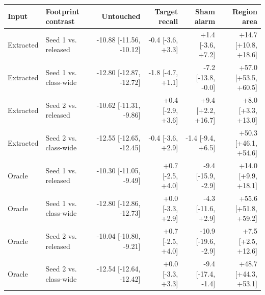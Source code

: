 \begin{tabular}{llrrrr}
\toprule
Input & Footprint contrast & Untouched & Target recall & Sham alarm & Region area \\
\midrule
Extracted & Seed 1 vs. released & -10.88 [-11.56, -10.12] & -0.4 [-3.6, +3.3] & +1.4 [-3.6, +7.2] & +14.7 [+10.8, +18.6] \\
Extracted & Seed 1 vs. class-wide & -12.80 [-12.87, -12.72] & -1.8 [-4.7, +1.1] & -7.2 [-13.8, -0.0] & +57.0 [+53.5, +60.5] \\
Extracted & Seed 2 vs. released & -10.62 [-11.31, -9.86] & +0.4 [-2.9, +3.6] & +9.4 [+2.2, +16.7] & +8.0 [+3.3, +13.0] \\
Extracted & Seed 2 vs. class-wide & -12.55 [-12.65, -12.45] & -0.4 [-3.6, +2.9] & -1.4 [-9.4, +6.5] & +50.3 [+46.1, +54.6] \\
\midrule
Oracle & Seed 1 vs. released & -10.30 [-11.05, -9.49] & +0.7 [-2.5, +4.0] & -9.4 [-15.9, -2.9] & +14.0 [+9.9, +18.1] \\
Oracle & Seed 1 vs. class-wide & -12.80 [-12.86, -12.73] & +0.0 [-3.3, +2.9] & -4.3 [-11.6, +2.9] & +55.6 [+51.8, +59.2] \\
Oracle & Seed 2 vs. released & -10.04 [-10.80, -9.21] & +0.7 [-2.5, +4.0] & -10.9 [-19.6, -2.9] & +7.5 [+2.5, +12.6] \\
Oracle & Seed 2 vs. class-wide & -12.54 [-12.64, -12.42] & +0.0 [-3.3, +3.3] & -9.4 [-17.4, -1.4] & +48.7 [+44.3, +53.1] \\
\bottomrule
\end{tabular}

